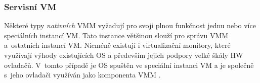 \subsubsection{Servisní VM}
\label{chapter:virtualization:vmm:types:servise}
Některé typy \textit{nativních} VMM vyžadují pro svoji plnou funkčnost jednu nebo více speciálních instancí VM. Tato instance
většinou slouží pro správu VMM a~ostatních instancí VM. Nicméně existují i virtualizační monitory, které využívají výhody
existujících OS a především jejich podpory velké škály HW ovladačů. V~tomto případě je OS spuštěn ve speciální instanci VM
a je společně s~jeho ovladači využíván jako komponenta VMM \cite{cvut:presentation:virt1}.